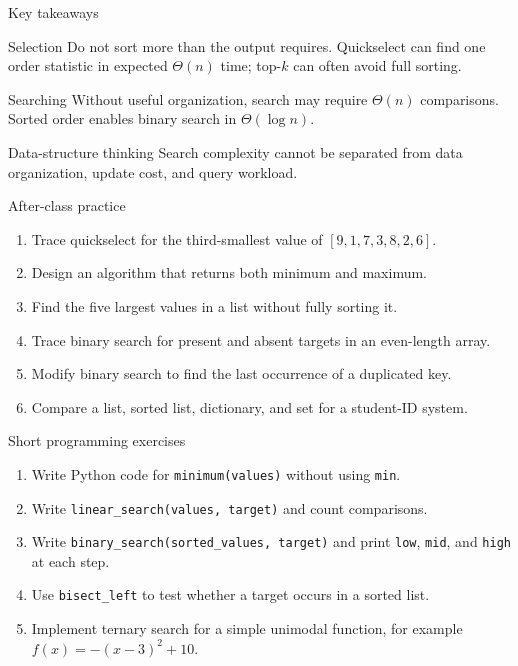 \documentclass[aspectratio=169]{beamer}
\begin{document}
\begin{frame}{Key takeaways}
  \small
  \begin{block}{Selection}
    Do not sort more than the output requires. Quickselect can find one order
    statistic in expected $\Theta(n)$ time; top-$k$ can often avoid full sorting.
  \end{block}
  \begin{block}{Searching}
    Without useful organization, search may require $\Theta(n)$ comparisons.
    Sorted order enables binary search in $\Theta(\log n)$.
  \end{block}
  \begin{alertblock}{Data-structure thinking}
    Search complexity cannot be separated from data organization, update cost,
    and query workload.
  \end{alertblock}
\end{frame}

\begin{frame}{After-class practice}
  \small
  \begin{enumerate}
    \item Trace quickselect for the third-smallest value of $[9,1,7,3,8,2,6]$.
    \item Design an algorithm that returns both minimum and maximum.
    \item Find the five largest values in a list without fully sorting it.
    \item Trace binary search for present and absent targets in an even-length array.
    \item Modify binary search to find the last occurrence of a duplicated key.
    \item Compare a list, sorted list, dictionary, and set for a student-ID system.
  \end{enumerate}
\end{frame}

\begin{frame}{Short programming exercises}
  \small
  \begin{enumerate}
    \item Write Python code for \texttt{minimum(values)} without using \texttt{min}.
    \item Write \texttt{linear\_search(values, target)} and count comparisons.
    \item Write \texttt{binary\_search(sorted\_values, target)} and print
      \texttt{low}, \texttt{mid}, and \texttt{high} at each step.
    \item Use \texttt{bisect\_left} to test whether a target occurs in a sorted list.
    \item Implement ternary search for a simple unimodal function, for example
      $f(x)=-(x-3)^2+10$.
  \end{enumerate}
\end{frame}
\end{document}
